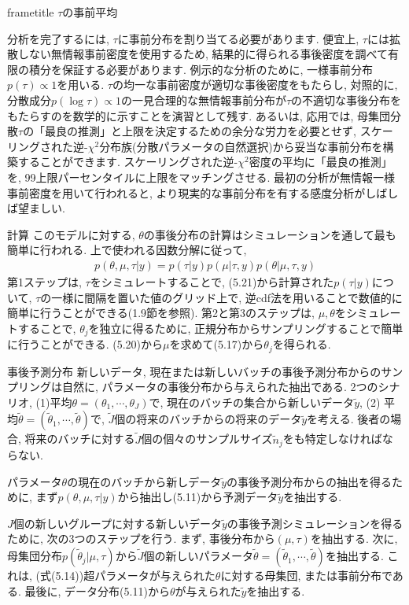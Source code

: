 \documentclass[10pt,dvipdfmx,a4]{beamer}
\newcommand{\eqn}[1]{\begin{align*}#1\end{align*}}
\newcommand{\dbox}[1]{\begin{beamercolorbox}[wd=122mm, sep=0pt, shadow=false, rounded=false]{frametitle} { #1}\end{beamercolorbox}}
\begin{document}
\begin{frame}
\dbox{$\tau$の事前平均}
分析を完了するには, $\tau$に事前分布を割り当てる必要があります.
便宜上, $\tau$には拡散しない無情報事前密度を使用するため, 結果的に得られる事後密度を調べて有限の積分を保証する必要があります.
例示的な分析のために, 一様事前分布$p(\tau)\propto 1$を用いる.
$\tau$の均一な事前密度が適切な事後密度をもたらし, 対照的に, 分散成分$p(\log\tau)\propto 1$の一見合理的な無情報事前分布が$\tau$の不適切な事後分布をもたらすのを数学的に示すことを演習として残す.
あるいは, 応用では, 母集団分散$\tau$の「最良の推測」と上限を決定するための余分な労力を必要とせず, スケーリングされた逆-$\chi^2$分布族(分散パラメータの自然選択)から妥当な事前分布を構築することができます.
スケーリングされた逆-$\chi^2$密度の平均に「最良の推測」を, 99上限パーセンタイルに上限をマッチングさせる.
最初の分析が無情報一様事前密度を用いて行われると, より現実的な事前分布を有する感度分析がしばしば望ましい.
\end{frame}


\begin{frame}{計算}
このモデルに対する, $\theta$の事後分布の計算はシミュレーションを通して最も簡単に行われる.
上で使われる因数分解に従って,
\eqn{p(\theta,\mu,\tau|y)=p(\tau|y)p(\mu|\tau,y)p(\theta|\mu,\tau,y)}
第1ステップは, $\tau$をシミュレートすることで, (5.21)から計算された$p(\tau|y)$について, $\tau$の一様に間隔を置いた値のグリッド上で, 逆cdf法を用いることで数値的に簡単に行うことができる(1.9節を参照).
第2と第3のステップは, $\mu, \theta$をシミュレートすることで, $\theta_j$を独立に得るために, 正規分布からサンプリングすることで簡単に行うことができる.
(5.20)から$\mu$を求めて(5.17)から$\theta_j$を得られる.
\end{frame}


\begin{frame}{事後予測分布}
新しいデータ, 現在または新しいバッチの事後予測分布からのサンプリングは自然に, パラメータの事後分布から与えられた抽出である.
2つのシナリオ, (1)平均$\theta=(\theta_1,\cdots,\theta_J)$で, 現在のバッチの集合から新しいデータ$\tilde{y}$, (2) 平均$\tilde{\theta}=(\tilde{\theta}_1,\cdots,\tilde{\theta})$で, $\tilde{J}$個の将来のバッチからの将来のデータ$\tilde{y}$を考える.
後者の場合, 将来のバッチに対する$\tilde{J}$個の個々のサンプルサイズ$\tilde{n}_j$をも特定しなければならない.

パラメータ$\theta$の現在のバッチから新しデータ$\tilde{y}$の事後予測分布からの抽出を得るために, まず$p(\theta,\mu,\tau|y)$から抽出し(5.11)から予測データ$\tilde{y}$を抽出する.

$J$個の新しいグループに対する新しいデータ$\tilde{y}$の事後予測シミュレーションを得るために, 次の3つのステップを行う.
まず, 事後分布から$(\mu,\tau)$を抽出する.
次に, 母集団分布$p(\tilde{\theta}_j|\mu,\tau)$から$\tilde{J}$個の新しいパラメータ$\tilde{\theta}=(\tilde{\theta}_1,\cdots,\tilde{\theta})$を抽出する.
これは, (式(5.14))超パラメータが与えられた$\theta$に対する母集団, または事前分布である.
最後に, データ分布(5.11)から$\theta$が与えられた$\tilde{y}$を抽出する.
\end{frame}
\end{document}
